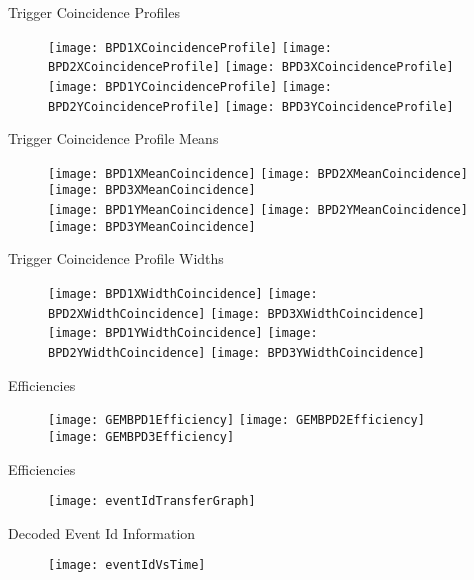 \documentclass[11pt]{beamer}
\begin{document}
\begin{frame}{Trigger Coincidence Profiles}
\begin{figure}
\centering
\texttt{[image: BPD1XCoincidenceProfile]}
\texttt{[image: BPD2XCoincidenceProfile]}
\texttt{[image: BPD3XCoincidenceProfile]} \\
\texttt{[image: BPD1YCoincidenceProfile]}
\texttt{[image: BPD2YCoincidenceProfile]}
\texttt{[image: BPD3YCoincidenceProfile]}
\end{figure}
\end{frame}

\begin{frame}{Trigger Coincidence Profile Means}
\begin{figure}
\centering
\texttt{[image: BPD1XMeanCoincidence]}
\texttt{[image: BPD2XMeanCoincidence]}
\texttt{[image: BPD3XMeanCoincidence]} \\
\texttt{[image: BPD1YMeanCoincidence]}
\texttt{[image: BPD2YMeanCoincidence]}
\texttt{[image: BPD3YMeanCoincidence]}
\end{figure}
\end{frame}

\begin{frame}{Trigger Coincidence Profile Widths}
\begin{figure}
\centering
\texttt{[image: BPD1XWidthCoincidence]}
\texttt{[image: BPD2XWidthCoincidence]}
\texttt{[image: BPD3XWidthCoincidence]} \\
\texttt{[image: BPD1YWidthCoincidence]}
\texttt{[image: BPD2YWidthCoincidence]}
\texttt{[image: BPD3YWidthCoincidence]}
\end{figure}
\end{frame}

\begin{frame}{Efficiencies}
\begin{figure}
\centering
\texttt{[image: GEMBPD1Efficiency]}
\texttt{[image: GEMBPD2Efficiency]}
\texttt{[image: GEMBPD3Efficiency]}
\end{figure}
\end{frame}

\begin{frame}{Efficiencies}
\begin{figure}
\centering
\texttt{[image: eventIdTransferGraph]}
\end{figure}
\end{frame}

\begin{frame}{Decoded Event Id Information}
\begin{figure}
\centering
\texttt{[image: eventIdVsTime]}
\end{figure}
\end{frame}
\end{document}
